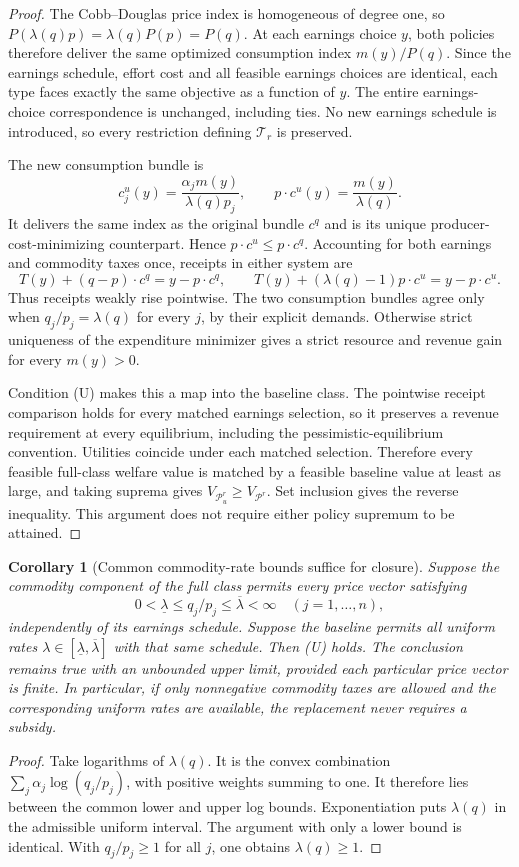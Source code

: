 \documentclass[11pt]{article}
\newtheorem{corollary}{Corollary}
\theoremstyle{definition}
\begin{document}
\begin{proof}
The Cobb--Douglas price index is homogeneous of degree one, so
$P(\lambda(q)p)=\lambda(q)P(p)=P(q)$. At each earnings choice $y$,
both policies therefore deliver the same optimized consumption index
$m(y)/P(q)$. Since the earnings schedule, effort cost and all feasible
earnings choices are identical, each type faces exactly the same
objective as a function of $y$. The entire earnings-choice correspondence
is unchanged, including ties. No new earnings schedule is introduced,
so every restriction defining $\mathcal T_r$ is preserved.

The new consumption bundle is
\[
 c_j^u(y)=\frac{\alpha_jm(y)}{\lambda(q)p_j},
 \qquad p\cdot c^u(y)=\frac{m(y)}{\lambda(q)}.
\]
It delivers the same index as the original bundle $c^q$ and is its
unique producer-cost-minimizing counterpart. Hence
$p\cdot c^u\leq p\cdot c^q$. Accounting for both earnings and
commodity taxes once, receipts in either system are
\[
 T(y)+(q-p)\cdot c^q=y-p\cdot c^q,
 \qquad
 T(y)+(\lambda(q)-1)p\cdot c^u=y-p\cdot c^u.
\]
Thus receipts weakly rise pointwise. The two consumption bundles agree
only when $q_j/p_j=\lambda(q)$ for every $j$, by their explicit demands.
Otherwise strict uniqueness of the expenditure minimizer gives a strict
resource and revenue gain for every $m(y)>0$.

Condition (U) makes this a map into the baseline class. The pointwise
receipt comparison holds for every matched earnings selection, so it
preserves a revenue requirement at every equilibrium, including the
pessimistic-equilibrium convention. Utilities coincide under each matched
selection. Therefore every feasible full-class welfare value is matched
by a feasible baseline value at least as large, and taking suprema gives
$V_{\mathcal P_u^r}\geq V_{\mathcal P^r}$. Set inclusion gives the
reverse inequality. This argument does not require either policy
supremum to be attained.
\end{proof}

\begin{corollary}[Common commodity-rate bounds suffice for closure]
Suppose the commodity component of the full class permits every price
vector satisfying
\[
 0<\underline\lambda\leq q_j/p_j\leq\overline\lambda<\infty
 \quad(j=1,\ldots,n),
\]
independently of its earnings schedule. Suppose the baseline permits all
uniform rates $\lambda\in[\underline\lambda,\overline\lambda]$
with that same schedule. Then (U) holds. The conclusion remains true
with an unbounded upper limit, provided each particular price vector is
finite. In particular, if only nonnegative commodity taxes are allowed
and the corresponding uniform rates are available, the replacement
never requires a subsidy.
\end{corollary}
\begin{proof}
Take logarithms of $\lambda(q)$. It is the convex combination
$\sum_j\alpha_j\log(q_j/p_j)$, with positive weights summing to one.
It therefore lies between the common lower and upper log bounds.
Exponentiation puts $\lambda(q)$ in the admissible uniform interval.
The argument with only a lower bound is identical. With $q_j/p_j\geq1$
for all $j$, one obtains $\lambda(q)\geq1$.
\end{proof}
\end{document}
